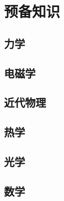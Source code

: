 

\section{预备知识}\label{1-3}

\subsection{力学}\label{1-3-1}

\subsection{电磁学}\label{1-3-2}

\subsection{近代物理}\label{1-3-3}

\subsection{热学}\label{1-3-4}

\subsection{光学}\label{1-3-5}

\subsection{数学}\label{1-3-6}